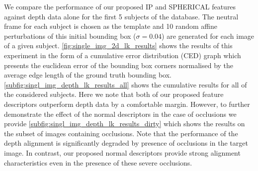 We compare the performance of our proposed IP and SPHERICAL features against
depth data alone for the first 5 subjects of the database. The neutral frame
for each subject is chosen as the template and 10 random affine perturbations
of this initial bounding box ($\sigma = 0.04$) are generated for each image
of a given subject.
\cref{fig:single_img_2d_lk_results} shows the results of this experiment in
the form of a cumulative error distribution (CED) graph which presents
the euclidean error of the bounding box corners normalised by the
average edge length of the ground truth bounding box.
\cref{subfig:singl_img_depth_lk_results_all} shows the cumulative results for
all of the considered subjects. Here we note that both of our proposed
feature descriptors outperform depth data by a comfortable margin. However,
to further demonstrate the effect of the normal descriptors in the case of
occlusions we provide \cref{subfig:singl_img_depth_lk_results_dirty} which
shows the results on the subset of images containing occlusions. Note that
the performance of the depth alignment is significantly degraded by presence
of occlusions in the target image. In contrast, our proposed normal descriptors
provide strong alignment characteristics even in the presence of these
severe occlusions.
